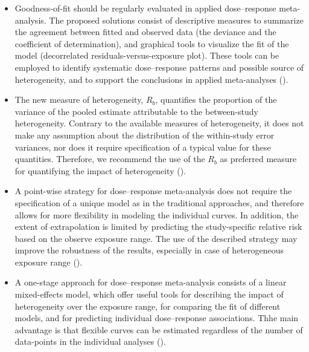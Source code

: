 \documentclass[11pt,a4paper,twoside,openany]{book}\usepackage{knitr}
\begin{document}
{\begin{itemize}
\item Goodness-of-fit should be regularly evaluated in applied dose--response meta-analysis. The proposed solutions consist of descriptive measures to summarize the agreement between fitted and observed data (the deviance and the coefficient of determination), and graphical tools to visualize the fit of the model (decorrelated residuals-versus-exposure plot). These tools can be employed to identify systematic dose--response patterns and possible source of heterogeneity, and to support the conclusions in applied meta-analyses ().

\item The new measure of heterogeneity, $R_b$, quantifies the proportion of the variance of the pooled estimate attributable to the between-study heterogeneity. Contrary to the available measures of heterogeneity, it does not make any assumption about the distribution of the within-study error variances, nor does it require specification of a typical value for these quantities. Therefore, we recommend the use of the $R_b$ as preferred measure for quantifying the impact of heterogeneity (). 

\item A point-wise strategy for dose--response meta-analysis does not require the specification of a unique model as in the traditional approaches, and therefore allows for more flexibility in modeling the individual curves. In addition, the extent of extrapolation is limited by predicting the study-specific relative risk based on the observe exposure range. The use of the described strategy may improve the robustness of the results, especially in case of heterogeneous exposure range ().

\item A one-stage approach for dose--response meta-analysis consists of a linear mixed-effects model, which offer useful tools for describing the impact of heterogeneity over the exposure range, for comparing the fit of different models, and for predicting individual dose--response associations. Thhe main advantage is that flexible curves can be estimated regardless of the number of data-points in the individual analyses ().

\end{itemize}


%

}
\end{document}
